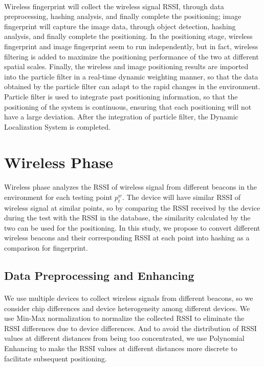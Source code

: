 \documentclass[a4paper,12pt]{report}
\begin{document}
\paragraph{}
Wireless fingerprint will collect the wireless signal RSSI, through data preprocessing, hashing analysis, and finally complete the positioning; image fingerprint will capture the image data, through object detection, hashing analysis, and finally complete the positioning. In the positioning stage, wireless fingerprint and image fingerprint seem to run independently, but in fact, wireless filtering is added to maximize the positioning performance of the two at different spatial scales. Finally, the wireless and image positioning results are imported into the particle filter in a real-time dynamic weighting manner, so that the data obtained by the particle filter can adapt to the rapid changes in the environment. Particle filter is used to integrate past positioning information, so that the positioning of the system is continuous, ensuring that each positioning will not have a large deviation. After the integration of particle filter, the Dynamic Localization System is completed.
%

\section{Wireless Phase}

\paragraph{}
Wireless phase analyzes the RSSI of wireless signal from different beacons in the environment for each testing point $p_t^w$. The device will have similar RSSI of wireless signal at similar points, so by comparing the RSSI received by the device during the test with the RSSI in the database, the similarity calculated by the two can be used for the positioning. In this study, we propose to convert different wireless beacons and their corresponding RSSI at each point into hashing as a comparison for fingerprint.
%

\subsection{Data Preprocessing and Enhancing}

\paragraph{}
We use multiple devices to collect wireless signals from different beacons, so we consider chip differences and device heterogeneity among different devices. We use Min-Max normalization to normalize the collected RSSI to eliminate the RSSI differences due to device differences. And to avoid the distribution of RSSI values at different distances from being too concentrated, we use Polynomial Enhancing to make the RSSI values at different distances more discrete to facilitate subsequent positioning.
%
\end{document}
